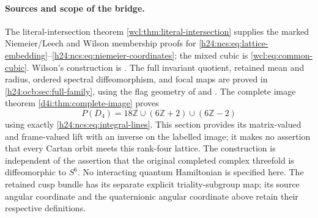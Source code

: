 \paragraph{Sources and scope of the bridge.}
The literal-intersection theorem \cref{wcl:thm:literal-intersection}
supplies the marked Niemeier/Leech and Wilson membership proofs for
\eqref{h24:ncs:eq:lattice-embedding}--\eqref{h24:ncs:eq:niemeier-coordinates};
the mixed cubic is \eqref{wcl:eq:common-cubic}. Wilson's construction
is \cite{esn:Wilson2009}. The full invariant quotient, retained
mean and radius, ordered spectral diffeomorphism, and focal maps are
proved in \cref{h24:ocb:sec:full-family}, using the flag geometry of
\cite[Sections~2.3--2.6]{h24:MareWillems2013} and
\cite[Proposition~2.8.2 and Theorems~2.7.4, 2.8.3]{h24:Yokota2009}.
The complete image theorem \cref{d4i:thm:complete-image} proves
\[
 P(D_4)=18\mathbb Z\cup(6\mathbb Z+2)\cup(6\mathbb Z-2)
\]
using exactly \eqref{h24:ncs:eq:integral-lines}. This section provides
its matrix-valued and frame-valued lift with an inverse on the
labelled image; it makes no assertion that every Cartan orbit meets
this rank-four lattice. The construction is independent of the
assertion that the original completed complex threefold is
diffeomorphic to $S^6$. No interacting quantum Hamiltonian is
specified here. The retained cusp bundle has its separate explicit
triality-subgroup map; its source angular coordinate and the
quaternionic angular coordinate above retain their respective
definitions.




